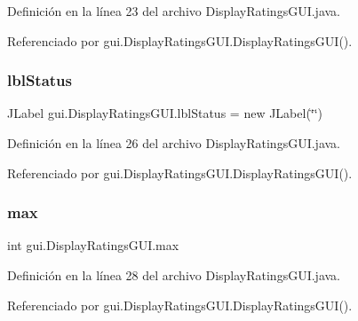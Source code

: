 Definición en la línea 23 del archivo Display\+Ratings\+G\+U\+I.\+java.



Referenciado por gui.\+Display\+Ratings\+G\+U\+I.\+Display\+Ratings\+G\+U\+I().

\mbox{\label{classgui_1_1_display_ratings_g_u_i_af22d979904bed66577197633479efb90}} 
\subsubsection{\texorpdfstring{lblStatus}{lblStatus}}
{\footnotesize\ttfamily J\+Label gui.\+Display\+Ratings\+G\+U\+I.\+lbl\+Status = new J\+Label(\char`\"{}\char`\"{})\hspace{0.3cm}{\ttfamily [private]}}



Definición en la línea 26 del archivo Display\+Ratings\+G\+U\+I.\+java.



Referenciado por gui.\+Display\+Ratings\+G\+U\+I.\+Display\+Ratings\+G\+U\+I().

\mbox{\label{classgui_1_1_display_ratings_g_u_i_a4c70177d900d213655a2687879b6b269}} 
\subsubsection{\texorpdfstring{max}{max}}
{\footnotesize\ttfamily int gui.\+Display\+Ratings\+G\+U\+I.\+max\hspace{0.3cm}{\ttfamily [private]}}



Definición en la línea 28 del archivo Display\+Ratings\+G\+U\+I.\+java.



Referenciado por gui.\+Display\+Ratings\+G\+U\+I.\+Display\+Ratings\+G\+U\+I().

\mbox{\label{classgui_1_1_display_ratings_g_u_i_ab2eff35a0e0def7edb919b19c3479495}} 
